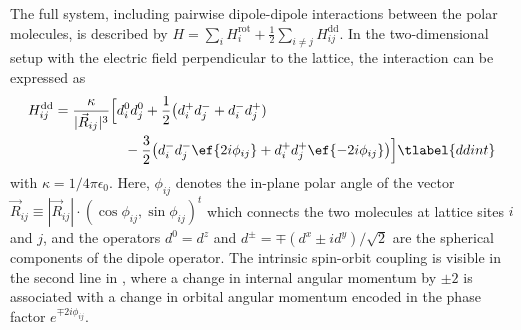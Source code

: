 
The full system, including pairwise dipole-dipole interactions between the polar molecules, is described by $H=\sum_i H^{\text{rot}}_i + \frac{1}{2}\sum_{i\ne j}H^{\text{dd}}_{ij}$.
In the two-dimensional setup with the electric field perpendicular to the lattice, the interaction can be expressed as
\begin{align}
    H^{\text{dd}}_{ij}=\frac{\kappa}{|\vec{R}_{ij}|^3} &\Big[d^0_i d^0_j + \frac{1}{2}\big(d^+_i d^-_j + d^-_i d^+_j) \nonumber \\
                                                       &\quad - \frac{3}{2}\big(d^-_i d^-_j \ef{2i\phi_{ij}} + d^+_i d^+_j \ef{-2i\phi_{ij}}\big)\Big] \tlabel{ddint}
\end{align}
with $\kappa=1/4\pi\epsilon_0$.
Here, $\phi_{ij}$ denotes the in-plane polar angle of the vector $\vec{R}_{ij} \equiv |\vec{R}_{ij}| \cdot (\cos \phi_{ij}, \sin \phi_{ij})^t$ which connects the two molecules at lattice sites $i$ and $j$, and the operators $d^0=d^z$ and $d^\pm=\mp (d^x\pm i d^y)/\sqrt{2}$ are the spherical components of the dipole operator.
The intrinsic spin-orbit coupling is visible in the second line in , where a change in internal angular momentum by $\pm 2$ is associated with a change in orbital angular momentum encoded in the phase factor $e^{\mp 2i \phi_{ij}}$.

